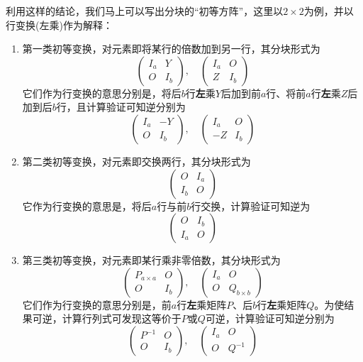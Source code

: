 \documentclass[a4paper,UTF8,fontset=windows]{ctexart}
\begin{document}
利用这样的结论，我们马上可以写出分块的``初等方阵''，这里以$2\times 2$为例，并以行变换(左乘)作为解释：
\begin{enumerate}
    \item 第一类初等变换，对元素即将某行的倍数加到另一行，其分块形式为
    $$\begin{pmatrix}I_a&Y\\O&I_b\end{pmatrix},\quad\begin{pmatrix}I_a&O\\Z&I_b\end{pmatrix}$$
    它们作为行变换的意思分别是，将后$b$行\textbf{左}乘$Y$后加到前$a$行、将前$a$行\textbf{左}乘$Z$后加到后$b$行，且计算验证可知逆分别为
    $$\begin{pmatrix}I_a&-Y\\O&I_b\end{pmatrix},\quad\begin{pmatrix}I_a&O\\-Z&I_b\end{pmatrix}$$
    \item 第二类初等变换，对元素即交换两行，其分块形式为
    $$\begin{pmatrix}O&I_a\\I_b&O\end{pmatrix}$$
    它作为行变换的意思是，将后$a$行与前$b$行交换，计算验证可知逆为
    $$\begin{pmatrix}O&I_b\\I_a&O\end{pmatrix}$$
    \item 第三类初等变换，对元素即某行乘非零倍数，其分块形式为
    $$\begin{pmatrix}P_{a\times a}&O\\O&I_b\end{pmatrix},\quad\begin{pmatrix}I_a&O\\O&Q_{b\times b}\end{pmatrix}$$
    它们作为行变换的意思分别是，前$a$行\textbf{左}乘矩阵$P$、后$b$行\textbf{左}乘矩阵$Q$。为使结果可逆，计算行列式可发现这等价于$P$或$Q$可逆，计算验证可知逆分别为
    $$\begin{pmatrix}P^{-1}&O\\O&I_b\end{pmatrix},\quad\begin{pmatrix}I_a&O\\O&Q^{-1}\end{pmatrix}$$
\end{enumerate}
\end{document}
